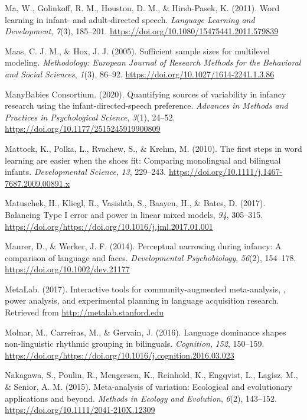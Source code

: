 \documentclass[
  english,
  ,man,floatsintext]{apa6}
\begin{document}
\leavevmode\hypertarget{ref-ma_2011}{}%
Ma, W., Golinkoff, R. M., Houston, D. M., \& Hirsh-Pasek, K. (2011). Word learning in infant- and adult-directed speech. \emph{Language Learning and Development}, \emph{7}(3), 185--201. \url{https://doi.org/10.1080/15475441.2011.579839}

\leavevmode\hypertarget{ref-maas_2005}{}%
Maas, C. J. M., \& Hox, J. J. (2005). Sufficient sample sizes for multilevel modeling. \emph{Methodology: European Journal of Research Methods for the Behavioral and Social Sciences}, \emph{1}(3), 86--92. \url{https://doi.org/10.1027/1614-2241.1.3.86}

\leavevmode\hypertarget{ref-manybabies_consortium_2020}{}%
ManyBabies Consortium. (2020). Quantifying sources of variability in infancy research using the infant-directed-speech preference. \emph{Advances in Methods and Practices in Psychological Science}, \emph{3}(1), 24--52. \url{https://doi.org/10.1177/2515245919900809}

\leavevmode\hypertarget{ref-mattock_2010}{}%
Mattock, K., Polka, L., Rvachew, S., \& Krehm, M. (2010). The first steps in word learning are easier when the shoes fit: Comparing monolingual and bilingual infants. \emph{Developmental Science}, \emph{13}, 229--243. \url{https://doi.org/10.1111/j.1467-7687.2009.00891.x}

\leavevmode\hypertarget{ref-matuschek_2017}{}%
Matuschek, H., Kliegl, R., Vasishth, S., Baayen, H., \& Bates, D. (2017). Balancing Type I error and power in linear mixed models, \emph{94}, 305--315. \url{https://doi.org/https://doi.org/10.1016/j.jml.2017.01.001}

\leavevmode\hypertarget{ref-maurer_2014}{}%
Maurer, D., \& Werker, J. F. (2014). Perceptual narrowing during infancy: A comparison of language and faces. \emph{Developmental Psychobiology}, \emph{56}(2), 154--178. \url{https://doi.org/10.1002/dev.21177}

\leavevmode\hypertarget{ref-metalab_2017}{}%
MetaLab. (2017). Interactive tools for community-augmented meta-analysis, , power analysis, and experimental planning in language acquisition research. Retrieved from \url{http://metalab.stanford.edu}

\leavevmode\hypertarget{ref-molnar_2016}{}%
Molnar, M., Carreiras, M., \& Gervain, J. (2016). Language dominance shapes non-linguistic rhythmic grouping in bilinguals. \emph{Cognition}, \emph{152}, 150--159. \url{https://doi.org/https://doi.org/10.1016/j.cognition.2016.03.023}

\leavevmode\hypertarget{ref-nakagawa_2015}{}%
Nakagawa, S., Poulin, R., Mengersen, K., Reinhold, K., Engqvist, L., Lagisz, M., \& Senior, A. M. (2015). Meta-analysis of variation: Ecological and evolutionary applications and beyond. \emph{Methods in Ecology and Evolution}, \emph{6}(2), 143--152. \url{https://doi.org/10.1111/2041-210X.12309}
\end{document}
